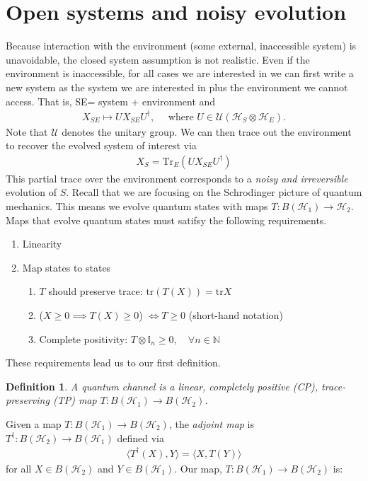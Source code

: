 \documentclass[10pt,oneside,longbibliography]{report}
\newtheorem{definition}{Definition}[section]
\begin{document}
\section{Open systems and noisy evolution}
Because interaction with the environment (some external, inaccessible system) is unavoidable, the closed system assumption is not realistic. Even if the environment is inaccessible, for all cases we are interested in we can first write a new system as the system we are interested in plus the environment we cannot access. That is, SE= system + environment and 
\begin{align}
X_{SE} \mapsto U X_{SE} U^{\dagger}, \quad \text{ where } U\in \mathcal{U}(\mathcal{H}_S\otimes \mathcal{H}_E).
\end{align}
Note that $\mathcal{U}$ denotes the unitary group. We can then trace out the environment to recover the evolved system of interest via
\begin{align}
    X_S = \text{Tr}_E (U X_{SE} U^{\dagger})
\end{align}
This partial trace over the environment corresponds to a \textit{noisy and irreversible} evolution of $S$. Recall that we are focusing on the Schrodinger picture of quantum mechanics. This means we evolve quantum states with maps $T:B(\mathcal{H}_1) \rightarrow \mathcal{H}_2$. Maps that evolve quantum states must satifsy the following requirements. 
\begin{enumerate}
    \item Linearity
    \item Map states to states
    \begin{enumerate}
        \item $T$ should preserve trace: $\text{tr}(T(X))=\text{tr}X$
        \item ($X\geq 0 \implies T(X) \geq 0$) $\Leftrightarrow T \geq 0$ (short-hand notation)
        \item Complete positivity: $T\otimes \mathbb{I}_n \geq 0, \quad \forall n\in \mathbb{N}$
    \end{enumerate}
\end{enumerate}
These requirements lead us to our first definition. 
\begin{definition}
A quantum channel is a linear, completely positive (CP), trace-preserving (TP) map $T: B(\mathcal{H}_1)\rightarrow B(\mathcal{H}_2)$.
\end{definition}

Given a map $T: B(\mathcal{H}_1)\rightarrow B(\mathcal{H}_2)$, the \textit{adjoint map} is $T^{\dagger}:B(\mathcal{H}_2)\rightarrow B(\mathcal{H}_1)$ defined via
\begin{align}
    \langle T^{\dagger}(X),Y \rangle = \langle X, T(Y) \rangle 
\end{align}
for all $X\in B(\mathcal{H}_2)$ and $Y\in B(\mathcal{H}_1)$. Our map, $T: B(\mathcal{H}_1)\rightarrow B(\mathcal{H}_2)$ is: 
\end{document}
